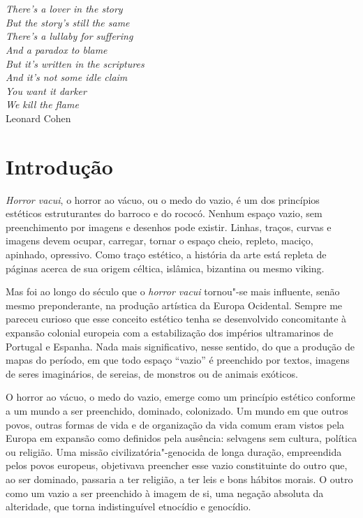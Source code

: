 
\chapter*{}
\thispagestyle{empty}
\begin{vplace}[30]
\begin{flushright}
\emph{There's a lover in the story\\
But the story's still the same\\
There's a lullaby for suffering\\
And a paradox to blame\\
But it's written in the scriptures\\
And it's not some idle claim\\
You want it darker\\
We kill the flame}\\[5pt]
Leonard Cohen 
\end{flushright}
\end{vplace}

\chapter{Introdução}


\emph{Horror vacui}, o horror ao vácuo, ou o medo do vazio, é um dos
princípios estéticos estruturantes do barroco e do rococó. Nenhum espaço
vazio, sem preenchimento por imagens e desenhos pode existir. Linhas,
traços, curvas e imagens devem ocupar, carregar, tornar o espaço cheio,
repleto, maciço, apinhado, opressivo. Como traço estético, a história da
arte está repleta de páginas acerca de sua origem céltica, islâmica,
bizantina ou mesmo viking.

Mas foi ao longo do século  que o \emph{horror vacui} tornou"-se mais
influente, senão mesmo preponderante, na produção artística da Europa
Ocidental. Sempre me pareceu curioso que esse conceito estético tenha se
desenvolvido concomitante à expansão colonial europeia com a
estabilização dos impérios ultramarinos de Portugal e Espanha. Nada mais
significativo, nesse sentido, do que a produção de mapas do período, em
que todo espaço ``vazio'' é preenchido por textos, imagens de seres
imaginários, de sereias, de monstros ou de animais exóticos.

O horror ao vácuo, o medo do vazio, emerge como um princípio estético
conforme a um mundo a ser preenchido, dominado, colonizado. Um mundo em
que outros povos, outras formas de vida e de organização da vida comum
eram vistos pela Europa em expansão como definidos pela ausência:
selvagens sem cultura, política ou religião. Uma missão
civilizatória"-genocida de longa duração, empreendida pelos povos
europeus, objetivava preencher esse vazio constituinte do outro que, ao
ser dominado, passaria a ter religião, a ter leis e bons hábitos morais.
O outro como um vazio a ser preenchido à imagem de si, uma negação
absoluta da alteridade, que torna indistinguível etnocídio e genocídio.

